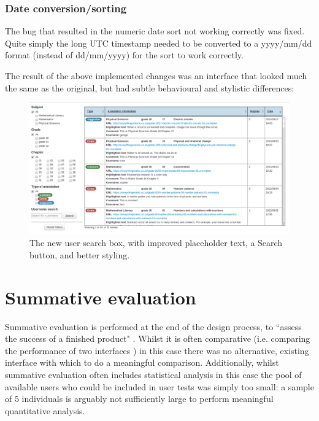 \subsubsection{Date conversion/sorting}
The bug that resulted in the numeric date sort not working correctly was fixed. Quite simply the long UTC timestamp needed to be converted to a yyyy/mm/dd format (instead of dd/mm/yyyy) for the sort to work correctly. 

The result of the above implemented changes was an interface that looked much the same as the original, but had subtle behavioural and stylistic differences: 
\begin{figure}[h!]
    \centering
    \includegraphics[width=\textwidth]{Figures/V2/wholeUI.png}
 \caption{The new user search box, with improved placeholder text, a Search button, and better styling.}
\end{figure}




\section{Summative evaluation}
Summative evaluation is performed at the end of the design process, to ``assess the success of a finished product" \citep[p. 437]{RogersPreece}. Whilst it is often comparative (i.e. comparing the performance of two interfaces \citep[p. 54]{GabbardHix}) in this case there was no alternative, existing interface with which to do a meaningful comparison. Additionally, whilst summative evaluation often includes statistical analysis \cite[p. 149]{Hartson} in this case the pool of available users who could be included in user tests was simply too small: a sample of 5 individuals is arguably not sufficiently large to perform meaningful quantitative analysis. 

